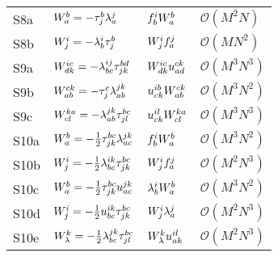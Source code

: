 \begin{center}
\begin{longtable}{@{}llll@{}}
                S8a
                & $W^{b}_{a} = -\tau^{b}_{j} \lambda^{j}_{a}$
                & $f^{i}_{b} W^{b}_{a}$
                & $\mathcal{O}(M^2 N)$
                \\

                S8b
                & $W^{i}_{j} = - \lambda^{i}_{b} \tau^{b}_{j}$
                & $W^{i}_{j} f^{j}_{a}$
                & $\mathcal{O}(M N^2)$
                \\

                S9a
                & $W^{ic}_{dk} = - \lambda^{ij}_{bc} \tau^{bd}_{jk}$
                & $W^{ic}_{dk} u^{ck}_{ad}$
                & $\mathcal{O}(M^3 N^3)$
                \\

                S9b
                & $W^{ck}_{ab} = - \tau^{c}_{j} \lambda^{jk}_{ab}$
                & $u^{ib}_{ck} W^{ck}_{ab}$
                & $\mathcal{O}(M^3 N^2)$
                \\

                S9c
                & $W^{ka}_{cl} = - \lambda^{jk}_{ab} \tau^{bc}_{jl}$
                & $u^{il}_{ck} W^{ka}_{cl}$
                & $\mathcal{O}(M^3 N^3)$
                \\

                S10a
                & $W^{b}_{a} = -\frac{1}{2} \tau^{bc}_{jk} \lambda^{jk}_{ac}$
                & $f^{i}_{b} W^{b}_{a}$
                & $\mathcal{O}(M^3 N^2)$
                \\

                S10b
                & $W^{i}_{j} = -\frac{1}{2} \lambda^{ik}_{bc} \tau^{bc}_{jk}$
                & $W^{i}_{j} f^{j}_{a}$
                & $\mathcal{O}(M^2 N^3)$
                \\

                S10c
                & $W^{b}_{a} = -\frac{1}{2} \tau^{bc}_{jk} u^{jk}_{ac}$
                & $\lambda^{i}_{b} W^{b}_{a}$
                & $\mathcal{O}(M^3 N^2)$
                \\

                S10d
                & $W^{i}_{j} = -\frac{1}{2} u^{ik}_{bc} \tau^{bc}_{jk}$
                & $W^{i}_{j} \lambda^{j}_{a}$
                & $\mathcal{O}(M^2 N^3)$
                \\

                S10e
                & $W^{k}_{\lambda} = -\frac{1}{2} \lambda^{jk}_{bc} \tau^{bc}_{jl}$
                & $W^{k}_{\lambda} u^{il}_{ak}$
                & $\mathcal{O}(M^2 N^3)$
                \\


\end{longtable}
\end{center}
